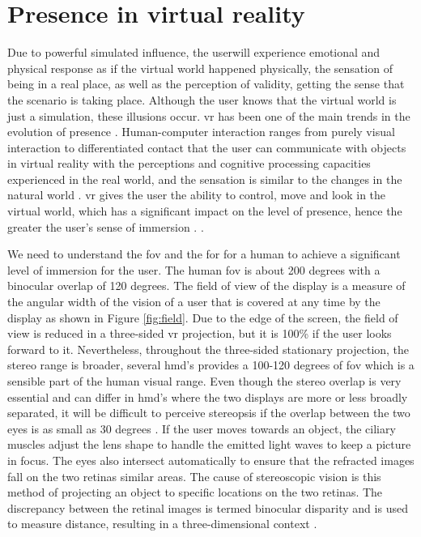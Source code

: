 \section{Presence in virtual reality} 
Due to powerful simulated influence, the userwill experience emotional and physical response as if the virtual world happened physically, the sensation of being in a real place, as well as the perception of validity, getting the sense that the scenario is taking place. Although the user knows that the virtual world is just a simulation, these illusions occur. \acrshort{vr} has been one of the main trends in the evolution of presence \citep{Waterworth2014, Steinicke2016}.
Human-computer interaction ranges from purely visual interaction to differentiated contact that the user can communicate with objects in virtual reality with the perceptions and cognitive processing capacities experienced in the real world, and the sensation is similar to the changes in the natural world \citep{Hu2016}.
\acrshort{vr} gives the user the ability to control, move and look in the virtual world, which has a significant impact on the level of presence, hence the greater the user's sense of immersion \citep{William}. \cite[p.4]{Waterworth2014}.


We need to understand the \acrfull{fov} and the \acrfull{for} for a human to achieve a significant level of immersion for the user. The human \acrshort{fov} is about 200 degrees with a binocular overlap of 120 degrees. The field of view of the display is a measure of the angular width of the vision of a user that is covered at any time by the display as shown in Figure \ref{fig:field}. Due to the edge of the screen, the field of view is reduced in a three-sided \acrshort{vr} projection, but it is 100\% if the user looks forward to it. Nevertheless, throughout the three-sided stationary projection, the stereo range is broader, several \acrlong{hmd}'s provides a 100-120 degrees of \acrshort{fov} which is a sensible part of the human visual range. Even though the stereo overlap is very essential and can differ in \acrshort{hmd}'s where the two displays are more or less broadly separated, it will be difficult to perceive stereopsis if the overlap between the two eyes is as small as 30 degrees \citep{William}.
If the user moves towards an object, the ciliary muscles adjust the lens shape to handle the emitted light waves to keep a picture in focus. The eyes also intersect automatically to ensure that the refracted images fall on the two retinas similar areas. The cause of stereoscopic vision is this method of projecting an object to specific locations on the two retinas. The discrepancy between the retinal images is termed binocular disparity and is used to measure distance, resulting in a three-dimensional context \citep{Vince2011}.

